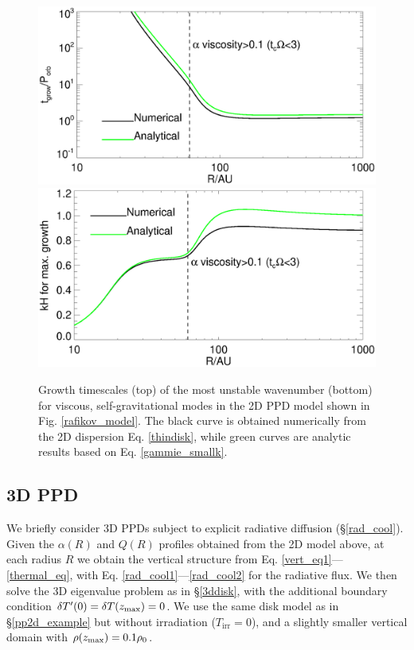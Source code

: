 \begin{figure}
  \includegraphics[width=\linewidth,clip=true,trim=0cm 1.5cm 0cm
    0.0cm]{figures/ppd_2d_growth}\\
  \includegraphics[width=\linewidth,clip=true,trim=0cm 0cm 0cm
    0.8cm]{figures/ppd_2d_maxk}
  \caption{Growth timescales (top) of the most unstable
    wavenumber (bottom) for viscous,
    self-gravitational modes in the 2D PPD model shown in
    Fig. \ref{rafikov_model}. 
    The black curve is obtained numerically
    from the 2D dispersion Eq. \ref{thindisk}, while green curves 
    are analytic results based on Eq. \ref{gammie_smallk}. 
    \label{rafikov_growth}}
\end{figure}


\subsection{3D PPD}
We briefly consider 3D PPDs subject to explicit radiative diffusion 
(\S\ref{rad_cool}). Given the $\alpha(R)$ and $Q(R)$ profiles obtained
from the 2D model above, at each radius $R$ we obtain the vertical
structure from Eq. \ref{vert_eq1}---\ref{thermal_eq}, with 
Eq. \ref{rad_cool1}---\ref{rad_cool2} for the radiative flux.
We then solve the 3D eigenvalue problem as in \S\ref{3ddisk}, with the
additional boundary condition $\delta T^\prime(0) = \delta T(z_\mathrm{max}) = 0$.    
We use the same disk model as in \S\ref{pp2d_example} but without 
irradiation ($T_\mathrm{irr}=0$), and a slightly smaller vertical
domain with $\rho(z_\mathrm{max})=0.1\rho_0$.  %

